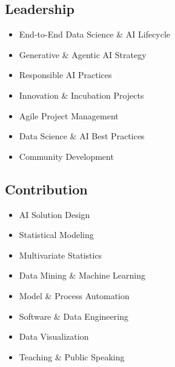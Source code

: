 \documentclass[letterpaper]{deedy-resume} %
\begin{document}
\begin{minipage}[t]{0.3\textwidth}
		\subsection{Leadership}
		\begin{itemize}[leftmargin=*, nosep]
			\item[$\cdot$] End-to-End Data Science \& AI Lifecycle
			\item[$\cdot$] Generative \& Agentic AI Strategy
			\item[$\cdot$] Responsible AI Practices
			\item[$\cdot$] Innovation \& Incubation Projects
			\item[$\cdot$] Agile Project Management
			\item[$\cdot$] Data Science \& AI Best Practices
			\item[$\cdot$] Community Development
		\end{itemize}
		
		\vspace{15pt}

		\subsection{Contribution}
		\begin{itemize}[leftmargin=*,  nosep]
			\item[$\cdot$] AI Solution Design
			\item[$\cdot$] Statistical Modeling
			\item[$\cdot$] Multivariate Statistics
			\item[$\cdot$] Data Mining \& Machine Learning
			\item[$\cdot$] Model \& Process Automation
			\item[$\cdot$] Software \& Data Engineering
			\item[$\cdot$] Data Visualization
			\item[$\cdot$] Teaching \& Public Speaking
		\end{itemize}
		\sectionspace
\end{minipage} %
\hfill
\end{document}
